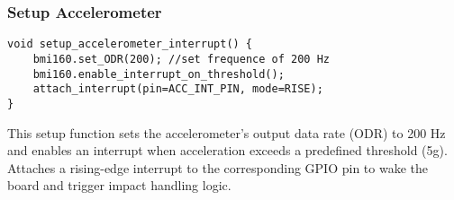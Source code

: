 \subsubsection{Setup Accelerometer}
\begin{verbatim}
void setup_accelerometer_interrupt() {
    bmi160.set_ODR(200); //set frequence of 200 Hz
    bmi160.enable_interrupt_on_threshold();
    attach_interrupt(pin=ACC_INT_PIN, mode=RISE);
}
\end{verbatim}

This setup function sets the accelerometer's output data rate (ODR) to 200 Hz and enables an interrupt when acceleration exceeds a predefined threshold (5g). Attaches a rising-edge interrupt to the corresponding GPIO pin to wake the board and trigger impact handling logic.

